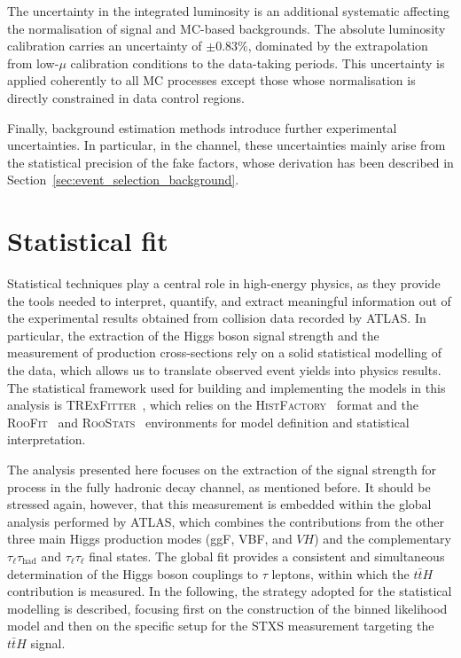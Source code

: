 The uncertainty in the integrated luminosity is an additional systematic affecting the normalisation of signal and MC-based backgrounds. The absolute luminosity calibration carries an uncertainty of $\pm 0.83\%$, dominated by the extrapolation from low-$\mu$ calibration conditions to the data-taking periods. This uncertainty is applied coherently to all MC processes except those whose normalisation is directly constrained in data control regions.  

Finally, background estimation methods introduce further experimental uncertainties. In particular, in the \ttHtt channel, these uncertainties mainly arise from the statistical precision of the fake factors, whose derivation has been described in Section~\ref{sec:event_selection_background}.




\section{Statistical fit}
\label{sec:statistical_tth}

Statistical techniques play a central role in high-energy physics, as they provide the tools needed to interpret, quantify, and extract meaningful information out of the experimental results obtained from collision data recorded by ATLAS.
In particular, the extraction of the Higgs boson signal strength and the measurement of production cross-sections rely on a solid statistical modelling of the data, which allows us to translate observed event yields into physics results. 
The statistical framework used for building and implementing the models in this analysis is \textsc{TRExFitter}~\cite{trexfitter}, which relies on the \textsc{HistFactory}~\cite{histfactory} format and the \textsc{RooFit}~\cite{roofit} and \textsc{RooStats}~\cite{roostats} environments for model definition and statistical interpretation. 

The analysis presented here focuses on the extraction of the signal strength for \ttHtt process in the fully hadronic decay channel, as mentioned before.
It should be stressed again, however, that this measurement is embedded within the global \htautau analysis performed by ATLAS, which combines the contributions from the other three main Higgs production modes (ggF, VBF, and $VH$) and the complementary $\tau_{\ell}\tau_{\mathrm{had}}$ and $\tau_{\ell}\tau_{\ell}$ final states. 
The global fit provides a consistent and simultaneous determination of the Higgs boson couplings to $\tau$ leptons, within which the $t\bar{t}H$ contribution is measured. 
In the following, the strategy adopted for the statistical modelling is described, focusing first on the construction of the binned likelihood model and then on the specific setup for the STXS measurement targeting the $t\bar{t}H$ signal.

